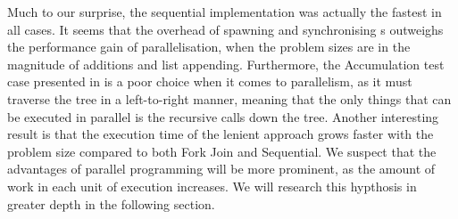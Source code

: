 Much to our surprise, the sequential implementation was actually the fastest in all cases. It seems that the overhead of spawning and synchronising s outweighs the performance gain of parallelisation, when the problem sizes are in the magnitude of additions and list appending. Furthermore, the Accumulation test case presented in \cite{DBLP:journals/cl/Tremblay-parallel} is a poor choice when it comes to parallelism, as it must traverse the tree in a left-to-right manner, meaning that the only things that can be executed in parallel is the recursive calls down the tree. Another interesting result is that the execution time of the lenient approach grows faster with the problem size compared to both Fork Join and Sequential. We suspect that the advantages of parallel programming will be more prominent, as the amount of work in each unit of execution increases. We will research this hypthosis in greater depth in the following section.
